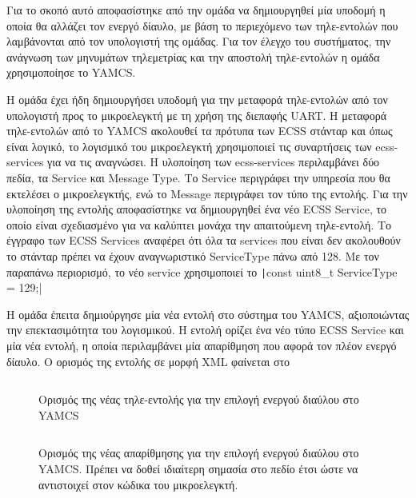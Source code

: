 \documentclass[a4paper,nobib,justified]{tufte-book}
\begin{document}
Για το σκοπό αυτό αποφασίστηκε από την ομάδα να δημιουργηθεί μία υποδομή η οποία θα αλλάζει τον ενεργό δίαυλο, με βάση το περιεχόμενο των τηλε-εντολών που λαμβάνονται από τον υπολογιστή της ομάδας. Για τον έλεγχο του συστήματος, την ανάγνωση των μηνυμάτων τηλεμετρίας και την αποστολή τηλε-εντολών η ομάδα χρησιμοποίησε το YAMCS.


Η ομάδα έχει ήδη δημιουργήσει υποδομή για την μεταφορά τηλε-εντολών από τον υπολογιστή προς το μικροελεγκτή με τη χρήση της διεπαφής UART. Η μεταφορά τηλε-εντολών από το YAMCS ακολουθεί τα πρότυπα των ECSS στάνταρ και όπως είναι λογικό, το λογισμικό του μικροελεγκτή χρησιμοποιεί τις συναρτήσεις των ecss-services για να τις αναγνώσει. Η υλοποίηση των ecss-services περιλαμβάνει δύο πεδία, τα Service και Message Type. Το Service περιγράφει την υπηρεσία που θα εκτελέσει ο μικροελεγκτής, ενώ το Message περιγράφει τον τύπο της εντολής. Για την υλοποίηση της εντολής αποφασίστηκε να δημιουργηθεί ένα νέο ECSS Service, το οποίο είναι σχεδιασμένο για να καλύπτει μονάχα την απαιτούμενη τηλε-εντολή. Το έγγραφο των ECSS Services  αναφέρει ότι όλα τα services που είναι δεν ακολουθούν το στάνταρ πρέπει να έχουν αναγνωριστικό ServiceType πάνω από 128. Με τον παραπάνω περιορισμό, το νέο service χρησιμοποιεί το \texttt|const uint8_t ServiceType = 129;|

Η ομάδα έπειτα δημιούργησε μία νέα εντολή στο σύστημα του YAMCS, αξιοποιώντας την επεκτασιμότητα του λογισμικού. Η εντολή ορίζει ένα νέο τύπο ECSS Service και μία νέα εντολή, η οποία περιλαμβάνει μία απαρίθμηση που αφορά τον πλέον ενεργό δίαυλο. Ο ορισμός της εντολής σε μορφή XML φαίνεται στο 

\begin{figure}[h]
	\inputminted{xml}{code/examples/yamcs-129,1.xml}
	\label{code:yamcs-xml}
	\caption[Ορισμός νέας τηλε-εντολής στο YAMCS]{Ορισμός της νέας τηλε-εντολής για την επιλογή ενεργού διαύλου στο YAMCS}
\end{figure}

\begin{figure}[h]
	\inputminted{xml}{code/examples/yamcs-enumeration.xml}
	\label{code:yamcs-enumeration}
	\caption[Ορισμός της απαρίθμησης στο YAMCS]{Ορισμός της νέας απαρίθμησης για την επιλογή ενεργού διαύλου στο YAMCS. Πρέπει να δοθεί ιδιαίτερη σημασία στο πεδίο έτσι ώστε να αντιστοιχεί στον κώδικα του μικροελεγκτή.}
\end{figure}
\end{document}
